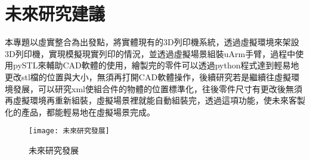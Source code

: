 \chapter{未來研究建議}

本專題以虛實整合為出發點，將實體現有的3D列印機系統，透過虛擬環境來架設3D列印機，實現模擬現實列印的情況，並透過虛擬場景組裝uArm手臂，過程中使用pySTL來輔助CAD軟體的使用，繪製完的零件可以透過python程式達到輕易地更改stl檔的位置與大小，無須再打開CAD軟體操作，後續研究若是繼續往虛擬環境發展，可以研究xml使組合件的物體的位置標準化，往後零件尺寸有更改後無須再虛擬環境再重新組裝，虛擬場景裡就能自動組裝完，透過這項功能，使未來客製化的產品，都能輕易地在虛擬場景完成。 \\


\begin{figure}[hbt!]
\begin{center}
\texttt{[image: 未來研究發展]}
\caption{\Large 未來研究發展}\label{未來研究發展}
\end{center}
\end{figure}
